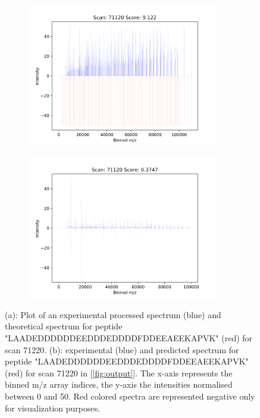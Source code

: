 \documentclass[11pt]{article}
\begin{document}
\begin{figure}
\centering
\begin{subfigure}[b]{1\textwidth}
\centering
    \includegraphics[width=0.92\textwidth]{figs/scan_71120_ps=False.png}
   \caption{}
   \label{fig:theo} 
\end{subfigure}
\begin{subfigure}[b]{1\textwidth}
\centering
   \includegraphics[width=0.92\textwidth]{figs/scan_71120_ps=True.png}
   \caption{}
   \label{fig:predict}
\end{subfigure}

\caption{(a): Plot of an experimental processed spectrum (blue) and theoretical spectrum for peptide "LAADEDDDDDDEEDDDEDDDDFDDEEAEEKAPVK" (red) for scan 71220. (b): experimental (blue) and predicted spectrum for peptide "LAADEDDDDDDEEDDDEDDDDFDDEEAEEKAPVK" (red) for scan 71220 in [\cref{fig:output}]. The x-axis represents the binned m/z array indices, the y-axis the intensities normalised between 0 and 50. Red colored spectra are represented negative only for visualization purposes.}
\label{predandtheo}
\end{figure}
\end{document}
